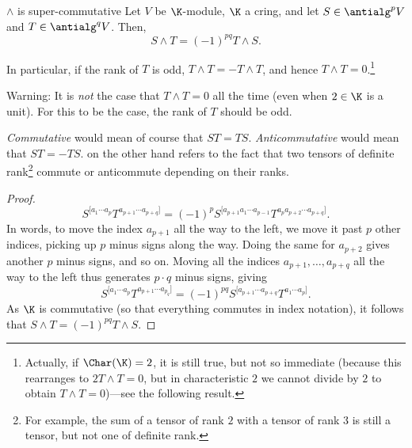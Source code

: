 \begin{prp}{$\wedge$ is super-commutative}{}
	Let $V$ be $\K$-module, $\K$ a cring, and let $S\in \antialg ^pV$ and $T\in \antialg ^qV$.  Then,
	\begin{equation}
		S\wedge T=(-1)^{pq}T\wedge S.
	\end{equation}
	\begin{rmk}
		In particular, if the rank of $T$ is odd, $T\wedge T=-T\wedge T$, and hence $T\wedge T=0$.\footnote{Actually, if $\Char (\K )=2$, it is still true, but not so immediate (because this rearranges to $2T\wedge T=0$, but in characteristic $2$ we cannot divide by $2$ to obtain $T\wedge T=0$)---see the following result.}
	\end{rmk}
	\begin{rmk}
		Warning:  It is \emph{not} the case that $T\wedge T=0$ all the time (even when $2\in \K$ is a unit).  For this to be the case, the rank of $T$ should be odd.
	\end{rmk}
	\begin{rmk}
		\emph{Commutative} would mean of course that $ST=TS$.  \emph{Anticommutative} would mean that $ST=-TS$.   on the other hand refers to the fact that two tensors of definite rank\footnote{For example, the sum of a tensor of rank $2$ with a tensor of rank $3$ is still a tensor, but not one of definite rank.} commute or anticommute depending on their ranks.
	\end{rmk}
	\begin{proof}
		\begin{equation*}
		S^{[a_1\cdots a_p}T^{a_{p+1}\cdots a_{p+q}]}=(-1)^pS^{[a_{p+1}a_1\cdots a_{p-1}}T^{a_pa_{p+2}\cdots a_{p+q}]}.
		\end{equation*}
		In words, to move the index $a_{p+1}$ all the way to the left, we move it past $p$ other indices, picking up $p$ minus signs along the way.  Doing the same for $a_{p+2}$ gives another $p$ minus signs, and so on.  Moving all the indices $a_{p+1},\ldots ,a_{p+q}$ all the way to the left thus generates $p\cdot q$ minus signs, giving
		\begin{equation*}
		S^{[a_1\cdots a_p}T^{a_{p+1}\cdots a_{p_q}]}=(-1)^{pq}S^{[a_{p+1}\cdots a_{p+q}}T^{a_1\cdots a_p]}.
		\end{equation*}
		As $\K$ is commutative (so that everything commutes in index notation), it follows that $S\wedge T=(-1)^{pq}T\wedge S$.
	\end{proof}
\end{prp}
